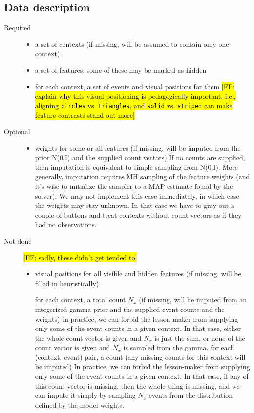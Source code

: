 \documentclass[11pt,letterpaper]{article}
\newcommand{\Note}[1]{}
\renewcommand{\Note}[1]{\hl{[#1]}}
\newcommand{\NoteSigned}[3]{{\sethlcolor{#2}\Note{#1: #3}}}
\newcommand{\NoteFF}[1]{\NoteSigned{FF}{LightBlue}{#1}}
\begin{document}
\subsection{Data description}
\begin{description}
\item[Required]

\begin{itemize}
\item a set of contexts (if missing, will be assumed to contain only one context)
\item a set of features; some of these may be marked as hidden
\item for each context, a set of events and visual positions for them \NoteFF{explain why this visual positioning is pedagogically important, i.e., aligning \texttt{circles} vs. \texttt{triangles}, and \texttt{solid} vs. \texttt{striped} can make feature contrasts stand out more}
\end{itemize}

\item[Optional]

\begin{itemize}
\item weights for some or all features (if missing, will be imputed from the prior N(0,I) and the supplied count vectors)
If no counts are supplied, then imputation is equivalent to simple sampling from N(0,I).
More generally, imputation requires MH sampling of the feature weights (and it’s wise to initialize the sampler to a MAP estimate found by the solver).  We may not implement this case immediately, in which case the weights may stay unknown.  In that case we have to gray out a couple of buttons and treat contexts without count vectors as if they had no observations.
\end{itemize}

\item[Not done] \NoteFF{sadly, these didn't get tended to}
\begin{itemize}
\item visual positions for all visible and hidden features (if missing, will be filled in heuristically)

for each context, a total count $N_x$ (if missing, will be imputed from an integerized gamma prior and the supplied event counts and the weights)
In practice, we can forbid the lesson-maker from supplying only some of the event counts in a given context.  In that case, either the whole count vector is given and $N_x$ is just the sum, or none of the count vector is given and $N_x$ is sampled from the gamma.
for each (context, event) pair, a count (any missing counts for this context will be imputed)
In practice, we can forbid the lesson-maker from supplying only some of the event counts in a given context.  In that case, if any of this count vector is missing, then the whole thing is missing, and we can impute it simply by sampling $N_x$ events from the distribution defined by the model weights.
\end{itemize}
\end{description}
\end{document}
